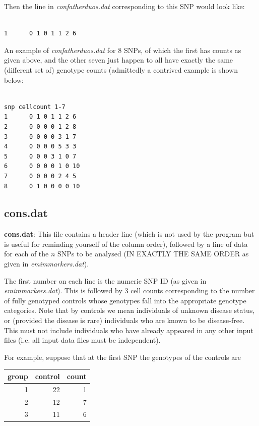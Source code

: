 \documentclass[a4paper,12pt]{article}
\begin{document}
Then the line in {\it confatherduos.dat} corresponding to this SNP would look like: 
\vspace{0.35cm} \begin{lstlisting}

1      0 1 0 1 1 2 6

\end{lstlisting} \vspace{0.35cm}
An example of {\it confatherduos.dat} for 8 SNPs, of which the first has counts as given above, and the other seven just happen to all have exactly the same (different set of) genotype counts (admittedly a contrived example is shown below: 
\vspace{0.35cm} \begin{lstlisting}

snp cellcount 1-7
1      0 1 0 1 1 2 6
2      0 0 0 0 1 2 8
3      0 0 0 0 3 1 7
4      0 0 0 0 5 3 3
5      0 0 0 3 1 0 7
6      0 0 0 0 1 0 10
7      0 0 0 0 2 4 5
8      0 1 0 0 0 0 10

\end{lstlisting} \vspace{0.35cm}

\subsection{cons.dat}
\label{cons}

{\bf cons.dat}: This file contains a header line (which is not used by the program but is useful for reminding yourself of the column order), followed by a line of data for each of the $n$ SNPs to be analysed (IN EXACTLY THE SAME ORDER as given in {\it emimmarkers.dat}). 

The first number on each line is the numeric SNP ID (as given in {\it emimmarkers.dat}). This is followed by 3 cell counts corresponding to the number of fully genotyped controls whose genotypes fall into the appropriate genotype categories. Note that by controls we mean individuals of unknown disease status, or (provided the disease is rare) individuals who are known to be disease-free. This must not include individuals who have already appeared in any other input files (i.e. all input data files must be independent). 

For example, suppose that at the first SNP the genotypes of the controls are 

{\begin{center}\begin{tabular}{rrr}
group  & control  & count\\
\hline
1  & 22  & 1\\
2  & 12  & 7\\
3  & 11  & 6\\
\end{tabular}\end{center}}
\end{document}
